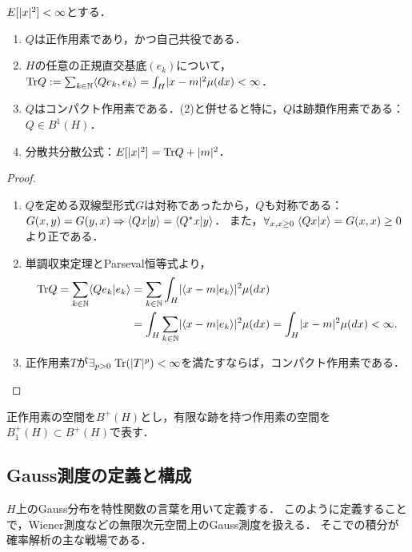 \documentclass[uplatex,dvipdfmx]{jsreport}
\begin{document}
\begin{lemma}[共分散作用素の性質]
    $E[\lvert x\rvert^2]<\infty$とする．
    \begin{enumerate}
        \item $Q$は正作用素であり，かつ自己共役である．
        \item $H$の任意の正規直交基底$(e_k)$について，$\mathrm{Tr} Q:=\sum_{k\in\mathbb{N}}\langle Qe_k,e_k\rangle=\int_H\lvert x-m\rvert^2\mu(dx)<\infty$．
        \item $Q$はコンパクト作用素である．(2)と併せると特に，$Q$は跡類作用素である：$Q\in B^1(H)$．
        \item 分散共分散公式：$E[\lvert x\rvert^2]=\mathrm{Tr} Q+\lvert m\rvert^2$．
    \end{enumerate}
\end{lemma}
\begin{proof}\mbox{}
    \begin{enumerate}
        \item $Q$を定める双線型形式$G$は対称であったから，$Q$も対称である：$G(x,y)=G(y,x)\Rightarrow\langle Qx|y\rangle=\langle Q^*x|y\rangle$．
        また，$\forall_{x,x\ge0}\;\langle Qx|x\rangle=G(x,x)\ge0$より正である．
        \item 単調収束定理とParseval恒等式より，
        \begin{align*}
            \mathrm{Tr} Q=\sum_{k\in\mathbb{N}}\langle Qe_k|e_k\rangle&=\sum_{k\in\mathbb{N}}\int_H\lvert\langle x-m|e_k\rangle\rvert^2\mu(dx)\\
            &=\int_H\sum_{k\in\mathbb{N}}\lvert\langle x-m|e_k\rangle\rvert^2\mu(dx)=\int_H\lvert x-m\rvert^2\mu(dx)<\infty.
        \end{align*}
        \item 正作用素$T$が$\exists_{p>0}\;\mathrm{Tr}(\lvert T\rvert^p)<\infty$を満たすならば，コンパクト作用素である．
    \end{enumerate}
\end{proof}

\begin{notation}
    正作用素の空間を$B^+(H)$とし，有限な跡を持つ作用素の空間を$B^+_1(H)\subset B^+(H)$で表す．
\end{notation}

\subsection{Gauss測度の定義と構成}

\begin{tcolorbox}[colframe=ForestGreen, colback=ForestGreen!10!white,breakable,colbacktitle=ForestGreen!40!white,coltitle=black,fonttitle=\bfseries\sffamily,
title=]
    $H$上のGauss分布を特性関数の言葉を用いて定義する．
    このように定義することで，Wiener測度などの無限次元空間上のGauss測度を扱える．
    そこでの積分が確率解析の主な戦場である．
\end{tcolorbox}
\end{document}
